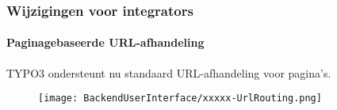 
\begin{frame}[fragile]
	\frametitle{Wijzigingen voor integrators}
	\framesubtitle{Paginagebaseerde URL-afhandeling}

 	TYPO3 ondersteunt nu standaard URL-afhandeling voor pagina's.

	\begin{figure}
		\texttt{[image: BackendUserInterface/xxxxx-UrlRouting.png]}
	\end{figure}

\end{frame}



%
%

